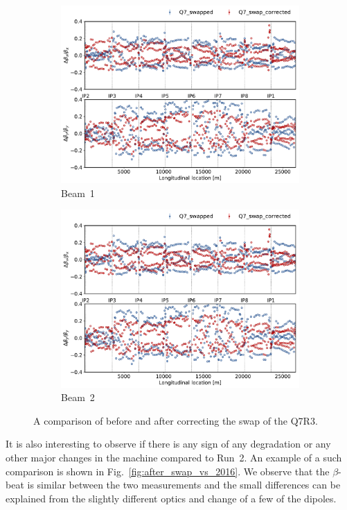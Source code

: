 \documentclass[a4paper]{cernatsnote}
\begin{document}
\begin{figure}[ht]
\begin{subfigure}{.5\textwidth}
  \centering
  \includegraphics[width=.8\linewidth]{plots/beam1/beta_beat_before_after_swap.pdf}  
  \caption{Beam~1}
  \label{fig:sub-first}
\end{subfigure}
\begin{subfigure}{.5\textwidth}
  \centering
  \includegraphics[width=.8\linewidth]{plots/beam1/beta_beat_before_after_swap.pdf}  
  \caption{Beam~2}
  \label{fig:sub-second}
\end{subfigure}
\caption{A comparison of before and after correcting the swap of the Q7R3.}
\label{fig:before_after_swap}
\end{figure}

It is also interesting to observe if there is any sign of any degradation or any other major changes in the machine compared to Run~2. An example of a such comparison is shown in Fig.~\ref{fig:after_swap_vs_2016}. We observe that the $\beta$-beat is similar between the two measurements and the small differences can be explained from the slightly different optics and change of a few of the dipoles. 
\end{document}
